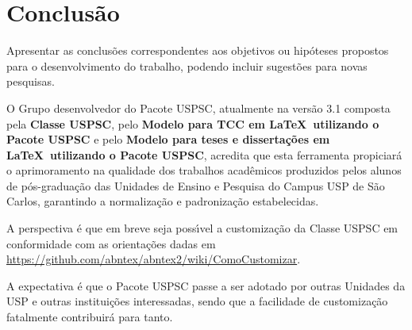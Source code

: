 \chapter{Conclus\~ao}
Apresentar as conclus\~oes correspondentes aos objetivos ou hip\'oteses propostos para o desenvolvimento do trabalho, podendo incluir  sugest\~oes para novas pesquisas.

O Grupo desenvolvedor do Pacote USPSC, atualmente na vers\~ao 3.1 composta pela \textbf{Classe USPSC}, pelo \textbf{Modelo para TCC em \LaTeX\ utilizando o Pacote USPSC} e pelo \textbf{Modelo para teses e disserta\c{c}\~oes em \LaTeX\ utilizando o Pacote USPSC}, acredita que esta ferramenta propiciar\'a o aprimoramento na qualidade dos trabalhos acad\^emicos produzidos pelos alunos de p\'os-gradua\c{c}\~ao das Unidades de Ensino e Pesquisa do Campus USP de S\~ao Carlos, garantindo a normaliza\c{c}\~ao e padroniza\c{c}\~ao estabelecidas.

A perspectiva \'e que em breve seja poss\'{\i}vel a customiza\c{c}\~ao da Classe USPSC em conformidade com as orienta\c{c}\~oes dadas em \url{https://github.com/abntex/abntex2/wiki/ComoCustomizar}.

A expectativa \'e que o Pacote USPSC passe a ser adotado por outras Unidades da USP e outras institui\c{c}\~oes interessadas, sendo que a facilidade de customiza\c{c}\~ao fatalmente contribuir\'a para tanto.

